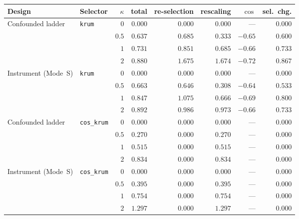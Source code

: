\documentclass{article}
\begin{document}
\begin{center}\small\setlength{\tabcolsep}{4pt}
\begin{tabular}{llrrrrrr}
\toprule
Design & Selector & $\kappa$ & total & re-selection & rescaling & $\cos$ & sel.\ chg. \\
\midrule
Confounded ladder & \texttt{krum} & $0$ & $0.000$ & $\mathbf{0.000}$ & $0.000$ & --- & $0.000$ \\
 &  & $0.5$ & $0.637$ & $\mathbf{0.685}$ & $0.333$ & $-0.65$ & $0.600$ \\
 &  & $1$ & $0.731$ & $\mathbf{0.851}$ & $0.685$ & $-0.66$ & $0.733$ \\
 &  & $2$ & $0.880$ & $\mathbf{1.675}$ & $1.674$ & $-0.72$ & $0.867$ \\
\midrule
Instrument (Mode~S) & \texttt{krum} & $0$ & $0.000$ & $\mathbf{0.000}$ & $0.000$ & --- & $0.000$ \\
 &  & $0.5$ & $0.663$ & $\mathbf{0.646}$ & $0.308$ & $-0.64$ & $0.533$ \\
 &  & $1$ & $0.847$ & $\mathbf{1.075}$ & $0.666$ & $-0.69$ & $0.800$ \\
 &  & $2$ & $0.892$ & $\mathbf{0.986}$ & $0.973$ & $-0.66$ & $0.733$ \\
\midrule
Confounded ladder & \texttt{cos\_krum} & $0$ & $0.000$ & $\mathbf{0.000}$ & $0.000$ & --- & $0.000$ \\
 &  & $0.5$ & $0.270$ & $\mathbf{0.000}$ & $0.270$ & --- & $0.000$ \\
 &  & $1$ & $0.515$ & $\mathbf{0.000}$ & $0.515$ & --- & $0.000$ \\
 &  & $2$ & $0.834$ & $\mathbf{0.000}$ & $0.834$ & --- & $0.000$ \\
\midrule
Instrument (Mode~S) & \texttt{cos\_krum} & $0$ & $0.000$ & $\mathbf{0.000}$ & $0.000$ & --- & $0.000$ \\
 &  & $0.5$ & $0.395$ & $\mathbf{0.000}$ & $0.395$ & --- & $0.000$ \\
 &  & $1$ & $0.754$ & $\mathbf{0.000}$ & $0.754$ & --- & $0.000$ \\
 &  & $2$ & $1.297$ & $\mathbf{0.000}$ & $1.297$ & --- & $0.000$ \\
\bottomrule
\end{tabular}
\end{center}
\end{document}
